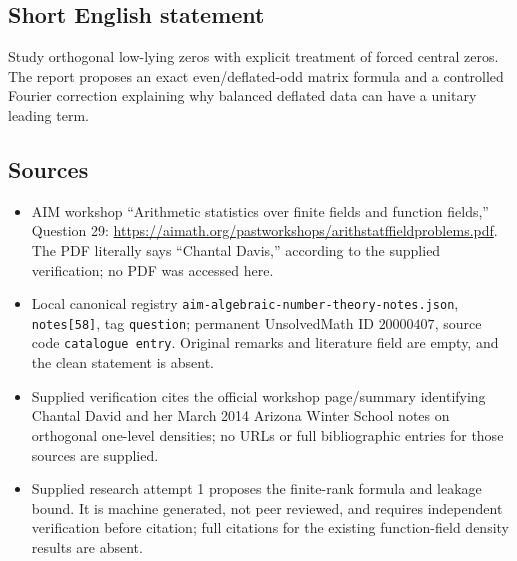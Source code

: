 \documentclass[11pt]{article}
\begin{document}
\subsection{Short English statement}
Study orthogonal low-lying zeros with explicit treatment of forced central zeros. The report proposes an exact even/deflated-odd matrix formula and a controlled Fourier correction explaining why balanced deflated data can have a unitary leading term.
\subsection{Sources}
\begin{itemize}
\item AIM workshop ``Arithmetic statistics over finite fields and function fields,'' Question 29: \url{https://aimath.org/pastworkshops/arithstatffieldproblems.pdf}. The PDF literally says ``Chantal Davis,'' according to the supplied verification; no PDF was accessed here.
\item Local canonical registry \texttt{aim-algebraic-number-theory-notes.json}, \texttt{notes[58]}, tag \texttt{question}; permanent UnsolvedMath ID \(20000407\), source code \texttt{catalogue entry}. Original remarks and literature field are empty, and the clean statement is absent.
\item Supplied verification cites the official workshop page/summary identifying Chantal David and her March 2014 Arizona Winter School notes on orthogonal one-level densities; no URLs or full bibliographic entries for those sources are supplied.
\item Supplied research attempt 1 proposes the finite-rank formula and leakage bound. It is machine generated, not peer reviewed, and requires independent verification before citation; full citations for the existing function-field density results are absent.
\end{itemize}
\end{document}
